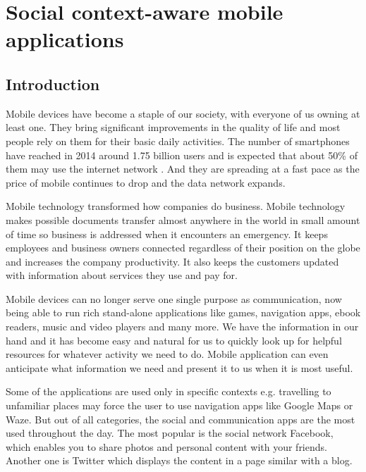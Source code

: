 
\chapter{Social context-aware mobile applications}\label{chap1}


\section{Introduction}

Mobile devices have become a staple of our society, with everyone of
us owning at least one. They bring significant improvements in the quality of
life and most people rely on them for their basic daily activities.
The number of smartphones have reached in 2014 around 1.75 billion users and is
expected that about 50\% of them may use the internet network \cite{emarketer}.
And they are spreading at a fast pace as the price of mobile continues to drop
and the data network expands.

Mobile technology transformed how companies do business. Mobile technology makes
possible documents transfer almost anywhere in the world in small amount of time
so business is addressed when it encounters an emergency. It keeps employees and
business owners connected regardless of their position on the globe and
increases the company productivity. It also keeps the customers updated with
information about services they use and pay for.

Mobile devices can no longer serve one single purpose as communication, now
being able to run rich stand-alone applications like games, navigation apps,
ebook readers, music and video players and many more. We have the information
in our hand and it has become easy and natural for us to quickly look up for
helpful resources for whatever activity we need to do. Mobile application can
even anticipate what information we need and present it to us when it is most
useful.

Some of the applications are used only in specific contexts e.g. travelling to
unfamiliar places may force the user to use navigation apps like Google Maps or
Waze. But out of all categories, the social and communication apps are the most
used throughout the day. The most popular is the social network Facebook, which
enables you to share photos and personal content with your friends. Another one
is Twitter which displays the content in a page similar with a blog.

